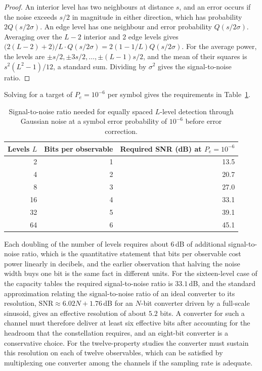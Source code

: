 \begin{proof}
An interior level has two neighbours at distance $s$, and an error occurs if the noise exceeds $s/2$ in magnitude in either direction, which has probability $2Q(s/2\sigma)$. An edge level has one neighbour and error probability $Q(s/2\sigma)$. Averaging over the $L-2$ interior and $2$ edge levels gives $\bigl(2(L-2)+2\bigr)/L\cdot Q(s/2\sigma)=2(1-1/L)Q(s/2\sigma)$. For the average power, the levels are $\pm s/2,\pm 3s/2,\dots,\pm(L-1)s/2$, and the mean of their squares is $s^2(L^2-1)/12$, a standard sum. Dividing by $\sigma^2$ gives the signal-to-noise ratio.
\end{proof}

Solving for a target of $P_e=10^{-6}$ per symbol gives the requirements in Table~\ref{tab:snr}.

\begin{table}[h]
\centering
\small
\begin{tabular}{@{}rrr@{}}
\toprule
Levels $L$ & Bits per observable & Required SNR (dB) at $P_e=10^{-6}$ \\
\midrule
2 & 1 & 13.5 \\
4 & 2 & 20.7 \\
8 & 3 & 27.0 \\
16 & 4 & 33.1 \\
32 & 5 & 39.1 \\
64 & 6 & 45.1 \\
\bottomrule
\end{tabular}
\caption{Signal-to-noise ratio needed for equally spaced $L$-level detection through Gaussian noise at a symbol error probability of $10^{-6}$ before error correction.}
\label{tab:snr}
\end{table}

Each doubling of the number of levels requires about $6$\,dB of additional signal-to-noise ratio, which is the quantitative statement that bits per observable cost power linearly in decibels, and the earlier observation that halving the noise width buys one bit is the same fact in different units. For the sixteen-level case of the capacity tables the required signal-to-noise ratio is $33.1$\,dB, and the standard approximation relating the signal-to-noise ratio of an ideal converter to its resolution, $\mathrm{SNR}\approx6.02N+1.76$\,dB for an $N$-bit converter driven by a full-scale sinusoid, gives an effective resolution of about $5.2$ bits. A converter for such a channel must therefore deliver at least six effective bits after accounting for the headroom that the constellation requires, and an eight-bit converter is a conservative choice. For the twelve-property studies the converter must sustain this resolution on each of twelve observables, which can be satisfied by multiplexing one converter among the channels if the sampling rate is adequate.

